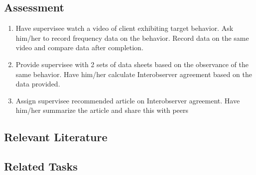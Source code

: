 \subsection{Assessment}
\begin{enumerate}
\item Have supervisee watch a video of client exhibiting target behavior. Ask him/her to record frequency data on the behavior. Record data on the same video and compare data after completion. 
\item Provide supervisee with 2 sets of data sheets based on the observance of the same behavior. Have him/her calculate Interobserver agreement based on the data provided.
\item Assign supervisee recommended article on Interobserver agreement. Have him/her summarize the article and share this with peers 
\end{enumerate}
%
\subsection{Relevant Literature}
\begin{refsection}
\nocite{test,alang2017police,clayton2018black}
\printbibliography[heading=none]
\end{refsection}
%
\subsection{Related Tasks}
\fouraOne{}\\
\fouraNine{}\\
\fourbTwo{}\\
\fourgSix{}\\
\fourhTwo{}\\
\fouriOne{}\\
\fouriFive{}\\
\fourjNine{}\\
\fourkFive{}\\
%
%
%
%
